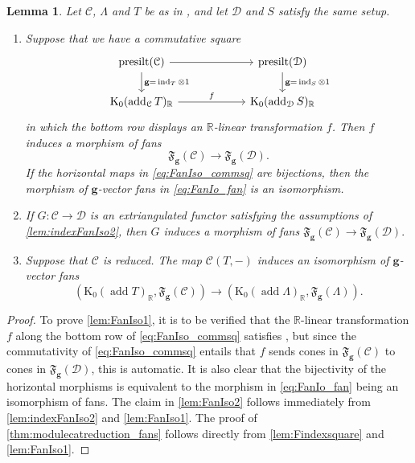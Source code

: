 \documentclass[10pt,twoside, a4paper,reqno]{amsart}
\DeclareMathOperator{\presilt}{presilt}
\DeclareMathOperator{\add}{add}
\DeclareMathOperator{\ind}{ind}
\newcommand{\partfan}[1]{\mathfrak{F}_{\bfg}(#1)}
\newcommand{\R}{\mathbb{R}}
\newcommand{\calC}{\mathcal{C}}
\newcommand{\calD}{\mathcal{D}}
\newcommand{\K}{\mathrm{K}}
\newcommand{\bfg}{\mathbf{g}}
\newtheorem{lemma}[theorem]{Lemma}
\theoremstyle{definition}
\begin{document}
\begin{lemma}\label{lem:FanIso}
    Let $\calC$, $\Lambda$ and $T$ be as in , and let $\calD$ and $S$ satisfy the same setup.
    \begin{enumerate}
        \item\label{lem:FanIso1} Suppose that we have a commutative square
    \begin{equation}\label{eq:FanIso_commsq}
    \begin{tikzcd}[column sep=6em]
        \presilt({\calC}) \arrow[d,"\bfg{=}\ind_T\otimes 1"] \arrow[r] & \presilt({\calD}) \arrow[d,"\bfg{=}\ind_S\otimes 1"] \\
        \K_0(\add_{\calC}T)_{\R} \arrow[r,"f"] & \K_0(\add_{\calD}S)_{\R}
    \end{tikzcd}
    \end{equation}
    in which the bottom row displays an $\R$-linear transformation $f$.
   Then $f$ induces a morphism of fans
    \begin{equation}\label{eq:FanIo_fan}
        \partfan{\calC} \to \partfan{\calD}.
    \end{equation}
    If the horizontal maps in \eqref{eq:FanIso_commsq} are bijections, then the morphism of $\bfg$-vector fans in \eqref{eq:FanIo_fan} is an isomorphism.
    \item\label{lem:FanIso2} If $G: \calC \to \calD$ is an extriangulated functor {satisfying the assumptions of \cref{lem:indexFanIso2}, then} $G$ induces a morphism of fans 
    $
        \partfan{\calC} \to \partfan{\calD}.
    $
   \item\label{thm:modulecatreduction_fans}
   Suppose that $\calC$ is reduced. {The map $\calC(T,-)$ induces an isomorphism of $\bfg$-vector fans}
    \begin{equation}\label{eq:partfanCtoLambda}
        (\K_0(\add T)_\R, \partfan{\calC}) \to (\K_0(\add \Lambda)_\R, \partfan{\Lambda}).
    \end{equation}
    \end{enumerate}
\end{lemma}
\begin{proof}
    {To prove \eqref{lem:FanIso1}}, {it} is to be verified that the $\R$-linear transformation $f$ along the bottom row of \eqref{eq:FanIso_commsq} satisfies , but since the commutativity of \eqref{eq:FanIso_commsq} entails that $f$ sends cones in $\partfan{\calC}$ to cones in $\partfan{\calD}$, this is automatic. It is also clear that the bijectivity of the horizontal morphisms is equivalent to the morphism in \eqref{eq:FanIo_fan} being an isomorphism of fans. The claim in {\eqref{lem:FanIso2} follows immediately from \cref{lem:indexFanIso2} and \eqref{lem:FanIso1}.}
    The proof of \eqref{thm:modulecatreduction_fans} follows directly from \cref{lem:Findexsquare} and \eqref{lem:FanIso1}.
\end{proof}
\end{document}
